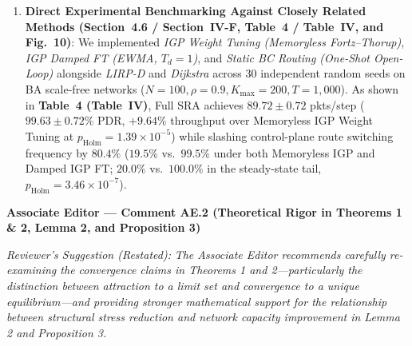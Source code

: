 \documentclass[11pt,a4paper]{article}
\newcommand{\cbox}[2]{%
  \vspace{0.6em}\noindent\textbf{#1}\par\smallskip
  \noindent\textit{Reviewer's Suggestion (Restated):} \textit{#2}\par\smallskip
}
\begin{document}
\begin{enumerate}[leftmargin=1.8em]
    \item \textbf{Direct Experimental Benchmarking Against Closely Related Methods (Section~4.6 / Section~IV-F, Table~4 / Table~IV, and Fig.~10)}: We implemented \textit{IGP Weight Tuning (Memoryless Fortz--Thorup)}, \textit{IGP Damped FT (EWMA, $T_d=1$)}, and \textit{Static BC Routing (One-Shot Open-Loop)} alongside \textit{LIRP-D} and \textit{Dijkstra} across 30 independent random seeds on BA scale-free networks ($N=100, \rho=0.9, K_{\max}=200, T=1{,}000$). As shown in \textbf{Table~4 (Table~IV)}, Full SRA achieves $89.72 \pm 0.72$ pkts/step ($99.63 \pm 0.72\%$ PDR, $+9.64\%$ throughput over Memoryless IGP Weight Tuning at $p_{\text{Holm}}=1.39 \times 10^{-5}$) while slashing control-plane route switching frequency by \textbf{$80.4\%$} ($19.5\%$ vs.\ $99.5\%$ under both Memoryless IGP and Damped IGP FT; $20.0\%$ vs.\ $100.0\%$ in the steady-state tail, $p_{\text{Holm}}=3.46 \times 10^{-7}$).
\end{enumerate}

\hrulefill

\cbox{Associate Editor --- Comment AE.2 (Theoretical Rigor in Theorems 1 \& 2, Lemma 2, and Proposition 3)}{The Associate Editor recommends carefully re-examining the convergence claims in Theorems 1 and 2---particularly the distinction between attraction to a limit set and convergence to a unique equilibrium---and providing stronger mathematical support for the relationship between structural stress reduction and network capacity improvement in Lemma 2 and Proposition 3.}
\end{document}
